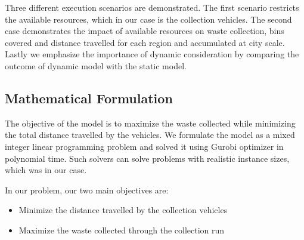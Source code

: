 \documentclass[12pt]{article}
\begin{document}
Three different execution scenarios are demonstrated. The first scenario restricts the available resources, which in our case is the collection vehicles. The second case demonstrates the impact of available resources on waste collection, bins covered and distance travelled for each region and accumulated at city scale. Lastly we emphasize the importance of dynamic consideration by comparing the outcome of dynamic model with the static model.



\subsection {Mathematical Formulation}

The objective of the model is to maximize the waste collected while minimizing the total distance travelled by the vehicles. We formulate the model as a mixed integer linear programming problem and solved it using Gurobi optimizer \cite{gurobi} in polynomial time. Such solvers can solve problems with realistic instance sizes, which was in our case.

In our problem, our two main objectives are:
\begin{itemize}
    \item Minimize the distance travelled by the collection vehicles
    \item Maximize the waste collected through the collection run
\end{itemize}
\end{document}
